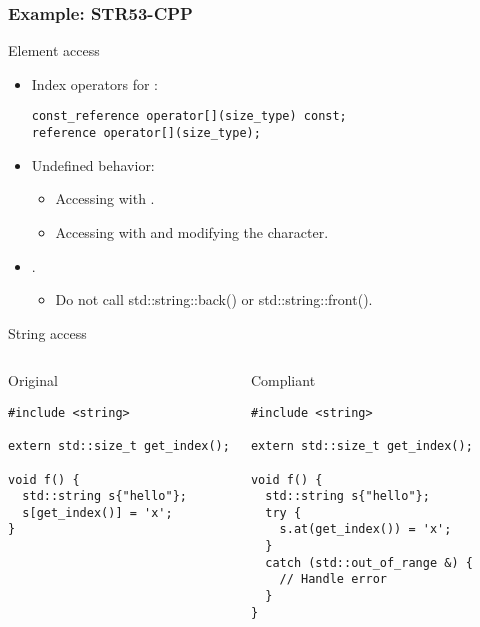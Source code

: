 \subsubsection{Example: STR53-CPP}

\begin{frame}[t,fragile]{Element access}
\begin{itemize}
  \item Index operators for :
\begin{lstlisting}
const_reference operator[](size_type) const;
reference operator[](size_type);
\end{lstlisting}

  \vfill
  \item Undefined behavior:
    \begin{itemize}
      \item Accessing with .
      \item Accessing with  and modifying the character.
    \end{itemize}

  \vfill
  \item {}.
    \begin{itemize}
      \item Do not call std::string::back() or std::string::front().
    \end{itemize}
\end{itemize}
\end{frame}

\begin{frame}[t,fragile]{String access}
\begin{columns}

\begin{block}{Original}
\begin{lstlisting}
#include <string>

extern std::size_t get_index();

void f() {
  std::string s{"hello"};
  s[get_index()] = 'x';
}
\end{lstlisting}
\end{block}

\pause
{}
\begin{block}{Compliant}
\begin{lstlisting}[escapechar=@]
#include <string>

extern std::size_t get_index();

void f() {
  std::string s{"hello"};
  try {
    s.at(get_index()) = 'x';
  }
  catch (std::out_of_range &) {
    // Handle error
  }
}
\end{lstlisting}
\end{block}

\end{columns}
\end{frame}

